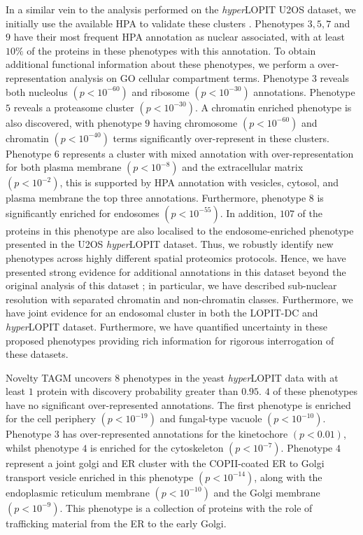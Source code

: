 \documentclass[12pt,english]{article}
\begin{document}
 In a similar vein to the analysis performed on the \textit{hyper}LOPIT U2OS dataset, we initially use the available HPA to validate these clusters \citep{Thul:2017}. Phenotypes $3,5,7$ and $9$ have their most frequent HPA annotation as nuclear associated, with at least $10\%$ of the proteins in these phenotypes with this annotation. To obtain additional functional information about these phenotypes, we perform a over-representation analysis on GO cellular compartment terms. Phenotype $3$ reveals both nucleolus $(p < 10^{-60})$ and ribosome $(p < 10^{-30})$ annotations. Phenotype $5$ reveals a proteasome cluster $(p < 10^{-30})$. A chromatin enriched phenotype is also discovered, with phenotype $9$ having chromosome $(p < 10^{-60})$ and chromatin $(p < 10^{-40})$ terms significantly over-represent in these clusters. Phenotype $6$ represents a cluster with mixed annotation with over-representation for both plasma membrane $(p < 10^{-8})$ and the extracellular matrix $(p < 10^{-2})$, this is supported by HPA annotation with vesicles, cytosol, and plasma membrane the top three annotations. Furthermore, phenotype $8$ is significantly enriched for endosomes $(p < 10^{-55})$. In addition, $107$ of the proteins in this phenotype are also localised to the endosome-enriched phenotype presented in the U2OS \textit{hyper}LOPIT dataset. Thus, we robustly identify new phenotypes across highly different spatial proteomics protocols. Hence, we have presented strong evidence for additional annotations in this dataset beyond the original analysis of this dataset \citep{DC:2018}; in particular, we have described sub-nuclear resolution with separated chromatin and non-chromatin classes. Furthermore, we have joint evidence for an endosomal cluster in both the LOPIT-DC and \textit{hyper}LOPIT dataset. Furthermore, we have quantified uncertainty in these proposed phenotypes providing rich information for rigorous interrogation of these datasets.
 
Novelty TAGM uncovers $8$ phenotypes in the yeast \textit{hyper}LOPIT data with at least $1$ protein with discovery probability greater than $0.95$. $4$ of these phenotypes have no significant over-represented annotations. The first phenotype is enriched for the cell periphery $(p < 10^{-19})$ and fungal-type vacuole $(p < 10^{-10})$. Phenotype $3$ has over-represented annotations for the kinetochore $(p < 0.01)$, whilst phenotype $4$ is enriched for the cytoskeleton $(p < 10^{-7})$. Phenotype $4$ represent a joint golgi and ER cluster with the COPII-coated ER to Golgi transport vesicle enriched in this phenotype $(p < 10^{-14})$, along with the endoplasmic reticulum membrane $(p < 10^{-10})$ and the Golgi membrane $(p < 10^{-9})$. This phenotype is a collection of proteins with the role of trafficking material from the ER to the early Golgi.  
 
\end{document}
